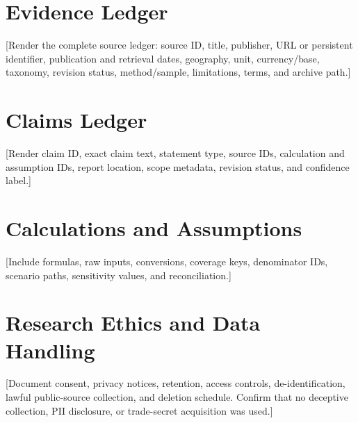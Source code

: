 \documentclass[11pt,letterpaper]{report}
\begin{document}
\appendix

\chapter{Evidence Ledger}
[Render the complete source ledger: source ID, title, publisher, URL or
persistent identifier, publication and retrieval dates, geography, unit,
currency/base, taxonomy, revision status, method/sample, limitations, terms,
and archive path.]

\chapter{Claims Ledger}
[Render claim ID, exact claim text, statement type, source IDs, calculation and
assumption IDs, report location, scope metadata, revision status, and
confidence label.]

\chapter{Calculations and Assumptions}
[Include formulas, raw inputs, conversions, coverage keys, denominator IDs,
scenario paths, sensitivity values, and reconciliation.]

\chapter{Research Ethics and Data Handling}
[Document consent, privacy notices, retention, access controls,
de-identification, lawful public-source collection, and deletion schedule.
Confirm that no deceptive collection, PII disclosure, or trade-secret
acquisition was used.]
\end{document}
